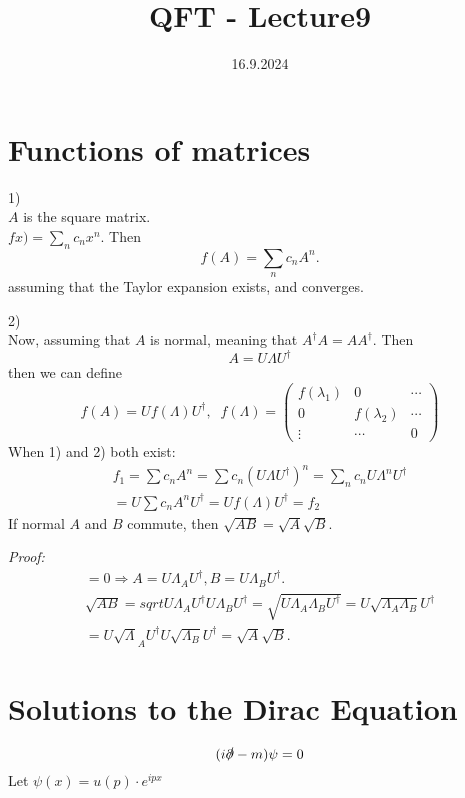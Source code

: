 \documentclass[]{scrartcl}
\title{QFT - Lecture9}
\author{}
\date{16.9.2024}
\begin{document}
\maketitle
\newpage
\tableofcontents
\newpage

\section{Functions of matrices}
1)\\
$A$ is the square matrix.\\
$fx) = \sum_{n}c_n x^n$. Then
$$
f(A) = \sum_{n} c_n A^n.
$$
assuming that the Taylor expansion exists, and converges.

2)\\
Now, assuming that $A$ is normal, meaning that $A^\dagger A = AA^\dagger$. Then
$$
A = U \Lambda U^\dagger
$$
then we can define
$$
f(A) = Uf(\Lambda)U^\dagger,\;\; f(\Lambda) = 
\begin{pmatrix}
	f(\lambda_1) & 0 & \cdots\\
	0 & f(\lambda_2) & \cdots\\
	\vdots & \cdots & 0
\end{pmatrix}
$$
When 1) and 2) both exist:
\begin{gather}
	f_1 = \sum c_n A^n = \sum c_n (U\Lambda U^\dagger)^n = \sum_n c_n U\Lambda^n U^\dagger\\
	= U \sum c_n A^n U^\dagger = U f(\Lambda) U ^\dagger = f_2
\end{gather}
If normal $A$ and $B$ commute, then $\sqrt{AB} = \sqrt A \sqrt B$.

\textit{Proof:}\\
\begin{gather}
	[A,B] = 0 \Rightarrow A = U \Lambda_A U^\dagger, B = U\Lambda_B U^\dagger.\\
	\sqrt{AB} = sqrt{U\Lambda_A U^\dagger U \Lambda_B U^\dagger} = \sqrt{U \Lambda_A \Lambda_B U^\dagger} = U\sqrt{\Lambda_A \Lambda_B}U^\dagger\\
	= U\sqrt\Lambda_A U^\dagger U \sqrt{\Lambda_B}U^\dagger = \sqrt A \sqrt B.
\end{gather}

\section{Solutions to the Dirac Equation}
\begin{equation}
	(i\slashed\partial - m) \psi = 0
\end{equation}
Let $\psi(x) = u(p)\cdot e^{ipx}$
\end{document}
